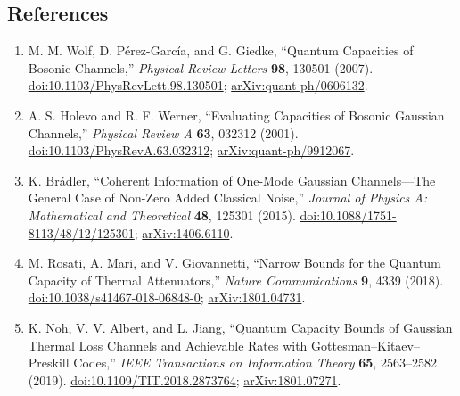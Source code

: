 \subsection*{References}

\begin{enumerate}[label={},leftmargin=4.8em,labelsep=0.5em]
  \footnotesize
  \item[\textup{[WPG07]}]\label{ref:p49-wolf-perez-garcia-giedke}
  M. M. Wolf, D. P\'erez-Garc\'ia, and G. Giedke,
  ``Quantum Capacities of Bosonic Channels,''
  \emph{Physical Review Letters} \textbf{98}, 130501 (2007).
  \href{https://doi.org/10.1103/PhysRevLett.98.130501}%
       {doi:10.1103/PhysRevLett.98.130501};
  \href{https://arxiv.org/abs/quant-ph/0606132}{arXiv:quant-ph/0606132}.

  \item[\textup{[HW01]}]\label{ref:p49-holevo-werner}
  A. S. Holevo and R. F. Werner,
  ``Evaluating Capacities of Bosonic Gaussian Channels,''
  \emph{Physical Review A} \textbf{63}, 032312 (2001).
  \href{https://doi.org/10.1103/PhysRevA.63.032312}%
       {doi:10.1103/PhysRevA.63.032312};
  \href{https://arxiv.org/abs/quant-ph/9912067}{arXiv:quant-ph/9912067}.

  \item[\textup{[Br15]}]\label{ref:p49-bradler}
  K. Br\'adler,
  ``Coherent Information of One-Mode Gaussian Channels---The General Case
  of Non-Zero Added Classical Noise,''
  \emph{Journal of Physics A: Mathematical and Theoretical} \textbf{48},
  125301 (2015).
  \href{https://doi.org/10.1088/1751-8113/48/12/125301}%
       {doi:10.1088/1751-8113/48/12/125301};
  \href{https://arxiv.org/abs/1406.6110}{arXiv:1406.6110}.

  \item[\textup{[RMG18]}]\label{ref:p49-rosati-mari-giovannetti}
  M. Rosati, A. Mari, and V. Giovannetti,
  ``Narrow Bounds for the Quantum Capacity of Thermal Attenuators,''
  \emph{Nature Communications} \textbf{9}, 4339 (2018).
  \href{https://doi.org/10.1038/s41467-018-06848-0}%
       {doi:10.1038/s41467-018-06848-0};
  \href{https://arxiv.org/abs/1801.04731}{arXiv:1801.04731}.

  \item[\textup{[NAJ19]}]\label{ref:p49-noh-albert-jiang}
  {\sloppy
  K. Noh, V. V. Albert, and L. Jiang,
  ``Quantum Capacity Bounds of Gaussian Thermal Loss Channels and
  Achievable Rates with Gottesman--Kitaev--Preskill Codes,''
  \emph{IEEE Transactions on Information Theory} \textbf{65}, 2563--2582
  (2019).
  \href{https://doi.org/10.1109/TIT.2018.2873764}%
       {doi:10.1109/TIT.2018.2873764};
  \href{https://arxiv.org/abs/1801.07271}{arXiv:1801.07271}.
  \par}


\end{enumerate}
